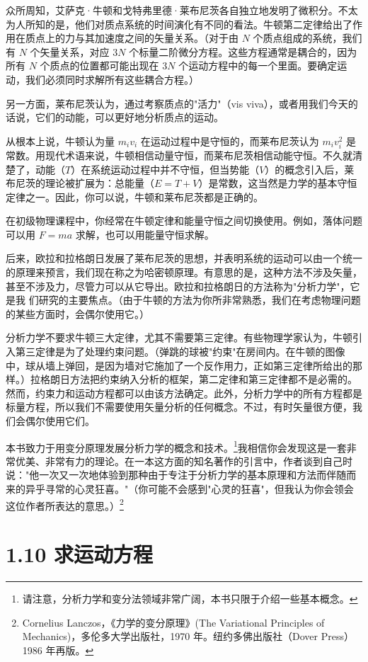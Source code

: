 众所周知，艾萨克·牛顿和戈特弗里德·莱布尼茨各自独立地发明了微积分。不太为人所知的是，他们对质点系统的时间演化有不同的看法。牛顿第二定律给出了作用在质点上的力与其加速度之间的矢量关系。（对于由 $N$ 个质点组成的系统，我们有 $N$ 个矢量关系，对应 $3N$ 个标量二阶微分方程。这些方程通常是耦合的，因为所有 $N$ 个质点的位置都可能出现在 $3N$ 个运动方程中的每一个里面。要确定运动，我们必须同时求解所有这些耦合方程。）

另一方面，莱布尼茨认为，通过考察质点的"活力"（vis viva），或者用我们今天的话说，它们的动能，可以更好地分析质点的运动。

从根本上说，牛顿认为量 $m_iv_i$ 在运动过程中是守恒的，而莱布尼茨认为 $m_iv_i^2$ 是常数。用现代术语来说，牛顿相信动量守恒，而莱布尼茨相信动能守恒。不久就清楚了，动能（$T$）在系统运动过程中并不守恒，但当势能（$V$）的概念引入后，莱布尼茨的理论被扩展为：总能量（$E = T + V$）是常数，这当然是力学的基本守恒定律之一。因此，你可以说，牛顿和莱布尼茨都是正确的。

在初级物理课程中，你经常在牛顿定律和能量守恒之间切换使用。例如，落体问题可以用 $F = ma$ 求解，也可以用能量守恒求解。

后来，欧拉和拉格朗日发展了莱布尼茨的思想，并表明系统的运动可以由一个统一的原理来预言，我们现在称之为哈密顿原理。有意思的是，这种方法不涉及矢量，甚至不涉及力，尽管力可以从它导出。欧拉和拉格朗日的方法称为"分析力学"，它是我
们研究的主要焦点。（由于牛顿的方法为你所非常熟悉，我们在考虑物理问题的某些方面时，会偶尔使用它。）

分析力学不要求牛顿三大定律，尤其不需要第三定律。有些物理学家认为，牛顿引入第三定律是为了处理约束问题。（弹跳的球被"约束"在房间内。在牛顿的图像中，球从墙上弹回，是因为墙对它施加了一个反作用力，正如第三定律所给出的那样。）拉格朗日方法把约束纳入分析的框架，第二定律和第三定律都不是必需的。然而，约束力和运动方程都可以由该方法确定。此外，分析力学中的所有方程都是标量方程，所以我们不需要使用矢量分析的任何概念。不过，有时矢量很方便，我们会偶尔使用它们。

本书致力于用变分原理发展分析力学的概念和技术。\footnote{请注意，分析力学和变分法领域非常广阔，本书只限于介绍一些基本概念。}我相信你会发现这是一套非常优美、非常有力的理论。在一本这方面的知名著作的引言中，作者谈到自己时说："他一次又一次地体验到那种由于专注于分析力学的基本原理和方法而伴随而来的异乎寻常的心灵狂喜。"（你可能不会感到"心灵的狂喜"，但我认为你会领会这位作者所表达的意思。）\footnote{Cornelius Lanczos，《力学的变分原理》(The Variational Principles of Mechanics)，多伦多大学出版社，1970 年。纽约多佛出版社（Dover Press）1986 年再版。}

\section*{1.10  求运动方程}

